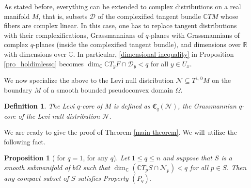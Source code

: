 \documentclass[12pt]{amsart}
\newtheorem{definition}[theorem]{Definition}
\newtheorem{pro}[theorem]{Proposition}
\numberwithin{equation}{section}
{\theoremstyle{definition}
\newtheorem{remark}[theorem]{Remark}
}
\newcommand{\N}{\mathcal{N}}
\newcommand{\D}{\mathcal{D}}
\newcommand{\C}{\mathbb{C}}
\newcommand{\R}{\mathbb{R}}
\newcommand{\Coreof}{\mathfrak{C}}
\begin{document}
\begin{remark}
As stated before, everything can be extended to complex distributions on a real manifold $M$, that is, subsets $\mathcal{D}$ of the complexified tangent bundle $\C TM$ whose fibers are complex linear. In this case, one has to replace tangent distributions with their complexifications, Grassmannians of $q$-planes with Grassmannians of complex $q$-planes (inside the complexified tangent bundle), and dimensions over $\R$ with dimensions over $\C$. In particular, \eqref{dimensional inequality} in Proposition \ref{pro_holdimlessq} becomes $\dim_\C \C T_yF\cap \D_y<q$ for all $y\in U_x$.
\end{remark}

We now specialize the above to the Levi null distribution $\mathcal{N}\subseteq T^{1,0}M$ on the boundary $M$ of a smooth bounded pseudoconvex domain $\Omega$. 

\begin{definition}
The \emph{Levi $q$-core} of $M$ is defined as $\Coreof_q(\mathcal{N})$, the Grassmannian $q$-core of the Levi null distribution $\mathcal{N}$.
\end{definition} We are ready to give the proof of Theorem \ref{main theorem}. We will utilize the following fact. %

\begin{pro}[ for $q=1$,  for any $q$]\label{pro:hol dim<q implies Pq}Let $1\leq q \leq n$ and suppose that $S$ is a smooth submanifold of $b\Omega$ such that $\dim_\C(\C T_pS\cap\N_p)<q$ for all $p\in S$. Then any compact subset of $S$ satisfies Property $(P_q)$.
\end{pro}
\end{document}
